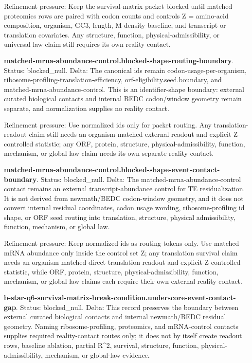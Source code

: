 Refinement pressure: Keep the survival-matrix packet blocked until matched proteomics rows are paired with codon counts and controls Z = amino-acid composition, organism, GC3, length, M-density baseline, and transcript or translation covariates. Any structure, function, physical-admissibility, or universal-law claim still requires its own reality contact.

\textbf{matched-mrna-abundance-control.blocked-shape-routing-boundary}. Status: blocked\_null. Delta: The canonical ids remain codon-usage-per-organism, ribosome-profiling-translation-efficiency, orf-eligibility.seed.boundary, and matched-mrna-abundance-control. This is an identifier-shape boundary: external curated biological contacts and internal BEDC codon/window geometry remain separate, and normalization supplies no reality contact.

Refinement pressure: Use normalized ids only for packet routing. Any translation-readout claim still needs an organism-matched external readout and explicit Z-controlled statistic; any ORF, protein, structure, physical-admissibility, function, mechanism, or global-law claim needs its own separate reality contact.

\textbf{matched-mrna-abundance-control.blocked-shape-event-contact-boundary}. Status: blocked\_null. Delta: The matched-mrna-abundance-control contact remains an external transcript-abundance control for TE residualization. It is not derived from newmath/BEDC codon-window geometry, and it does not convert internal residual coordinates, codon usage wording, ribosome-profiling id shape, or ORF seed routing into translation, structure, physical admissibility, function, mechanism, or global law.

Refinement pressure: Keep normalized ids as routing tokens only. Use matched mRNA abundance only inside the control set Z; any translation survival claim needs an organism-matched direct translation readout and explicit Z-controlled statistic, while ORF, protein, structure, physical-admissibility, function, mechanism, or global-law claims each require their own external reality contact.

\textbf{b-star-q6-survival-matrix-break-condition.underscore-event-contact-gap}. Status: blocked\_null. Delta: This record preserves the boundary between external curated biological contacts and internal newmath/BEDC residual geometry. Naming ribosome-profiling, proteomics, and mRNA-control contacts supplies required reality-contact routes only; it does not by itself create readout rows, baseline ablation, partial R\textasciicircum{}2, survival, structure, function, physical-admissibility, mechanism, or global-law evidence.

